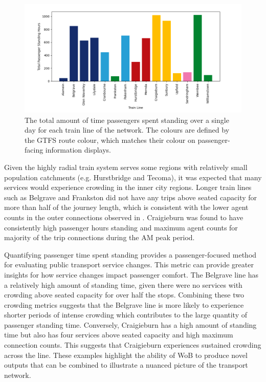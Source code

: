 \begin{figure}[ht]
    \centering
    \includegraphics[width=0.85\linewidth]{images/Case_Study/standing_hours.png}
    \caption[Hours passengers spent standing over a single day]{The total amount of time passengers spent standing over a single day for each train line of the network. The colours are defined by the GTFS route colour, which matches their colour on passenger-facing information displays.}
    \label{fig:standing-minutes}
\end{figure}

Given the highly radial train system serves some regions with relatively small population catchments (e.g. Hurstbridge and Tecoma), it was expected that many services would experience crowding in the inner city regions. Longer train lines such as Belgrave and Frankston did not have any trips above seated capacity for more than half of the journey length, which is consistent with the lower agent counts in the outer connections observed in . Craigieburn was found to have consistently high passenger hours standing and maximum agent counts for majority of the trip connections during the AM peak period. 

Quantifying passenger time spent standing provides a passenger-focused method for evaluating public transport service changes. This metric can provide greater insights for how service changes impact passenger comfort. The Belgrave line has a relatively high amount of standing time, given there were no services with crowding above seated capacity for over half the stops. Combining these two crowding metrics suggests that the Belgrave line is more likely to experience shorter periods of intense crowding which contributes to the large quantity of passenger standing time. Conversely, Craigieburn has a high amount of standing time but also has four services above seated capacity and high maximum connection counts. This suggests that Craigieburn experiences sustained crowding across the line. These examples highlight the ability of WoB to produce novel outputs that can be combined to illustrate a nuanced picture of the transport network. 


